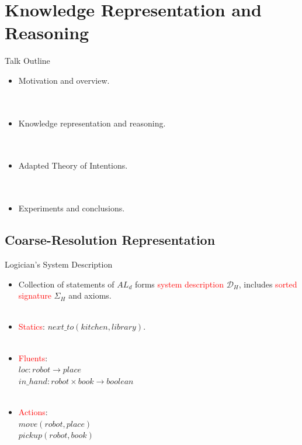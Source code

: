 \documentclass[xcolor=dvipsnames]{beamer}
\begin{document}
\section{Knowledge Representation and Reasoning}

\begin{frame}{Talk Outline}
  \begin{itemize}
  \item  Motivation and overview.
    \ \\
    \ \\
    \ \\
  \item Knowledge representation and reasoning.
    \ \\
    \ \\
    \ \\
  \item Adapted Theory of Intentions.
    \ \\
    \ \\
    \ \\
  \item Experiments and conclusions.
  \end{itemize}
\end{frame}


\subsection{Coarse-Resolution Representation}

\begin{frame}{Logician's System Description}
  \begin{itemize}
  \item Collection of statements of $AL_d$ forms
    \textcolor{red}{system description} $\mathcal{D}_H$, includes
    \textcolor{red}{sorted signature} $\Sigma_H$ and axioms.
    \ \\
    \ \\
  \item \textcolor{red}{Statics}: $next\_to(kitchen, library)$.
    \ \\
    \ \\
  \item \textcolor{red}{Fluents}:\ \\
    $loc : robot \rightarrow place$\ \\
    $in\_hand : robot \times book \rightarrow boolean$
    \ \\
    \ \\
  \item \textcolor{red}{Actions}:\ \\
    $move(robot, place)$\ \\
    $pickup(robot, book)$ 
  \end{itemize}
\end{frame}
\end{document}
